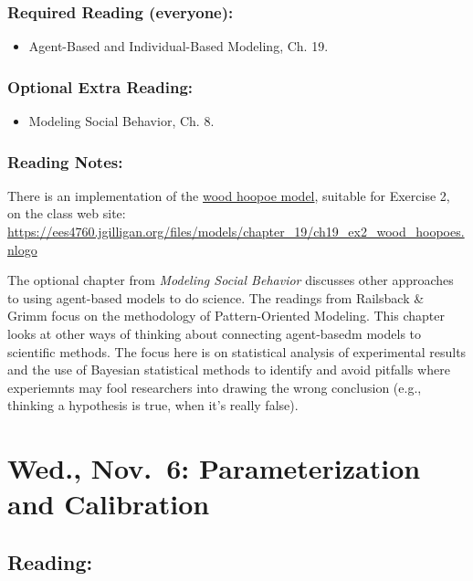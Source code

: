\documentclass[
]{article}
\providecommand{\tightlist}{%
  \setlength{\itemsep}{0pt}\setlength{\parskip}{0pt}}
\begin{document}
\subsubsection{Required Reading
(everyone):}\label{required-reading-everyone-17}

\begin{itemize}
\tightlist
\item
  Agent-Based and Individual-Based Modeling, Ch. 19.
\end{itemize}

\subsubsection{Optional Extra Reading:}\label{optional-extra-reading-4}

\begin{itemize}
\tightlist
\item
  Modeling Social Behavior, Ch. 8.
\end{itemize}

\subsubsection{Reading Notes:}\label{reading-notes-15}

There is an implementation of the
\href{/files/models/chapter_19/ch19_ex2_wood_hoopoes.nlogo}{wood hoopoe
model}, suitable for Exercise 2, on the class web site:
\url{https://ees4760.jgilligan.org/files/models/chapter_19/ch19_ex2_wood_hoopoes.nlogo}

The optional chapter from \emph{Modeling Social Behavior} discusses
other approaches to using agent-based models to do science. The readings
from Railsback \& Grimm focus on the methodology of Pattern-Oriented
Modeling. This chapter looks at other ways of thinking about connecting
agent-basedm models to scientific methods. The focus here is on
statistical analysis of experimental results and the use of Bayesian
statistical methods to identify and avoid pitfalls where experiemnts may
fool researchers into drawing the wrong conclusion (e.g., thinking a
hypothesis is true, when it's really false).

\section{Wed., Nov.~6: Parameterization and
Calibration}\label{wed.-nov.-6-parameterization-and-calibration}

\subsection{Reading:}\label{reading-21}
\end{document}

